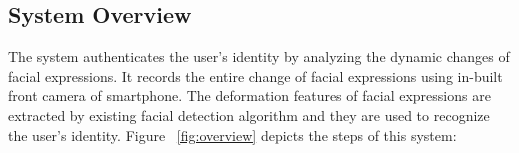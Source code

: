     \subsection{System Overview}
        The system authenticates the user's identity by analyzing the dynamic changes of facial expressions. It records the entire change of facial expressions using in-built front camera of smartphone. The deformation features of facial expressions are extracted by existing facial detection algorithm and they are used to recognize the user's identity.
        Figure ~\ref{fig:overview} depicts the steps of this system:
         